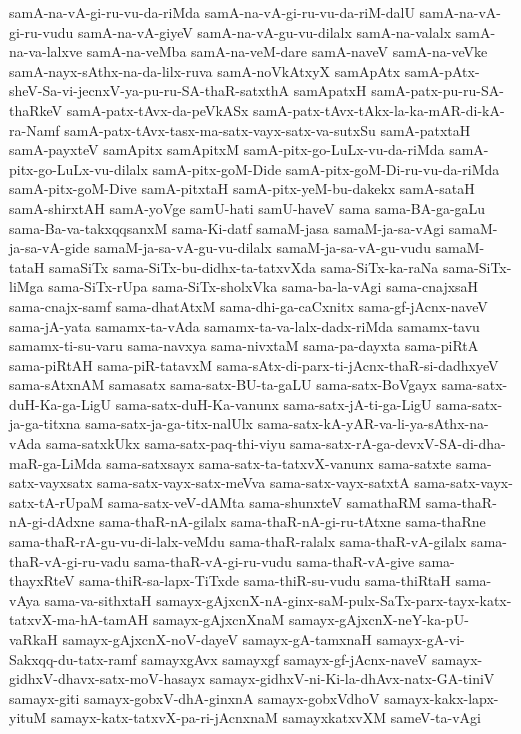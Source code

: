 {samA-na-vA-gi-ru-vu-da-riMda
samA-na-vA-gi-ru-vu-da-riM-dalU
samA-na-vA-gi-ru-vudu
samA-na-vA-giyeV
samA-na-vA-gu-vu-dilalx
samA-na-valalx
samA-na-va-lalxve
samA-na-veMba
samA-na-veM-dare
samA-naveV
samA-na-veVke
samA-nayx-sAthx-na-da-lilx-ruva
samA-noVkAtxyX
samApAtx
samA-pAtx-sheV-Sa-vi-jecnxV-ya-pu-ru-SA-thaR-satxthA
samApatxH
samA-patx-pu-ru-SA-thaRkeV
samA-patx-tAvx-da-peVkASx
samA-patx-tAvx-tAkx-la-ka-mAR-di-kA-ra-Namf
samA-patx-tAvx-tasx-ma-satx-vayx-satx-va-sutxSu
samA-patxtaH
samA-payxteV
samApitx
samApitxM
samA-pitx-go-LuLx-vu-da-riMda
samA-pitx-go-LuLx-vu-dilalx
samA-pitx-goM-Dide
samA-pitx-goM-Di-ru-vu-da-riMda
samA-pitx-goM-Dive
samA-pitxtaH
samA-pitx-yeM-bu-dakekx
samA-sataH
samA-shirxtAH
samA-yoVge
samU-hati
samU-haveV
sama
sama-BA-ga-gaLu
sama-Ba-va-takxqqsanxM
sama-Ki-datf
samaM-jasa
samaM-ja-sa-vAgi
samaM-ja-sa-vA-gide
samaM-ja-sa-vA-gu-vu-dilalx
samaM-ja-sa-vA-gu-vudu
samaM-tataH
samaSiTx
sama-SiTx-bu-didhx-ta-tatxvXda
sama-SiTx-ka-raNa
sama-SiTx-liMga
sama-SiTx-rUpa
sama-SiTx-sholxVka
sama-ba-la-vAgi
sama-cnajxsaH
sama-cnajx-samf
sama-dhatAtxM
sama-dhi-ga-caCxnitx
sama-gf-jAcnx-naveV
sama-jA-yata
samamx-ta-vAda
samamx-ta-va-lalx-dadx-riMda
samamx-tavu
samamx-ti-su-varu
sama-navxya
sama-nivxtaM
sama-pa-dayxta
sama-piRtA
sama-piRtAH
sama-piR-tatavxM
sama-sAtx-di-parx-ti-jAcnx-thaR-si-dadhxyeV
sama-sAtxnAM
samasatx
sama-satx-BU-ta-gaLU
sama-satx-BoVgayx
sama-satx-duH-Ka-ga-LigU
sama-satx-duH-Ka-vanunx
sama-satx-jA-ti-ga-LigU
sama-satx-ja-ga-titxna
sama-satx-ja-ga-titx-nalUlx
sama-satx-kA-yAR-va-li-ya-sAthx-na-vAda
sama-satxkUkx
sama-satx-paq-thi-viyu
sama-satx-rA-ga-devxV-SA-di-dha-maR-ga-LiMda
sama-satxsayx
sama-satx-ta-tatxvX-vanunx
sama-satxte
sama-satx-vayxsatx
sama-satx-vayx-satx-meVva
sama-satx-vayx-satxtA
sama-satx-vayx-satx-tA-rUpaM
sama-satx-veV-dAMta
sama-shunxteV
samathaRM
sama-thaR-nA-gi-dAdxne
sama-thaR-nA-gilalx
sama-thaR-nA-gi-ru-tAtxne
sama-thaRne
sama-thaR-rA-gu-vu-di-lalx-veMdu
sama-thaR-ralalx
sama-thaR-vA-gilalx
sama-thaR-vA-gi-ru-vadu
sama-thaR-vA-gi-ru-vudu
sama-thaR-vA-give
sama-thayxRteV
sama-thiR-sa-lapx-TiTxde
sama-thiR-su-vudu
sama-thiRtaH
sama-vAya
sama-va-sithxtaH
samayx-gAjxcnX-nA-ginx-saM-pulx-SaTx-parx-tayx-katx-tatxvX-ma-hA-tamAH
samayx-gAjxcnXnaM
samayx-gAjxcnX-neY-ka-pU-vaRkaH
samayx-gAjxcnX-noV-dayeV
samayx-gA-tamxnaH
samayx-gA-vi-Sakxqq-du-tatx-ramf
samayxgAvx
samayxgf
samayx-gf-jAcnx-naveV
samayx-gidhxV-dhavx-satx-moV-hasayx
samayx-gidhxV-ni-Ki-la-dhAvx-natx-GA-tiniV
samayx-giti
samayx-gobxV-dhA-ginxnA
samayx-gobxVdhoV
samayx-kakx-lapx-yituM
samayx-katx-tatxvX-pa-ri-jAcnxnaM
samayxkatxvXM
sameV-ta-vAgi
}
